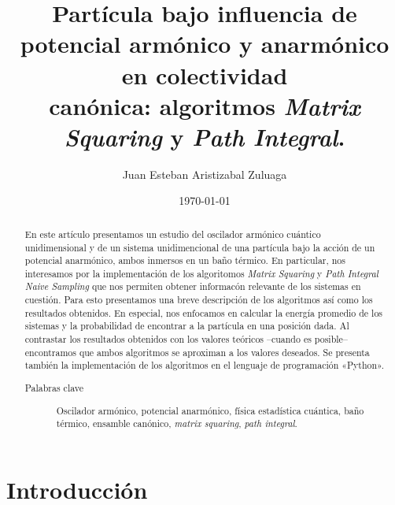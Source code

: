 \documentclass[%
 reprint,
 amsmath,amssymb,
 aps,
 pra,
]{revtex4-2}
\begin{document}

\title{Partícula bajo influencia de potencial armónico y anarmónico en colectividad\texorpdfstring{\\}{ }canónica: algoritmos \textit{Matrix Squaring} y \textit{Path Integral}.}%

\author{Juan Esteban Aristizabal Zuluaga}

\date{\today}%

\begin{abstract}
En este artículo presentamos un estudio del oscilador armónico cuántico unidimensional y de un sistema unidimencional de una partícula bajo la acción de un potencial anarmónico, ambos inmersos en un baño térmico. En particular, nos interesamos por la implementación de los algoritomos \textit{Matrix Squaring} y \textit{Path Integral Naive Sampling} que nos permiten obtener informacón relevante de los sistemas en cuestión. Para esto presentamos una breve descripción de los algoritmos así como los resultados obtenidos. En especial, nos enfocamos en calcular la energía promedio de los sistemas y la probabilidad de encontrar a la partícula en una posición dada. Al contrastar los resultados obtenidos con los valores teóricos –cuando es posible– encontramos que ambos algoritmos se aproximan a los valores deseados. Se presenta también la implementación de los algoritmos en el lenguaje de programación «Python». 
\begin{description}
\item[Palabras clave] 	Oscilador armónico, potencial anarmónico, física estadística cuántica, baño\\
térmico, ensamble canónico, \textit{matrix squaring}, \textit{path integral}.
\end{description}
\end{abstract}

\maketitle


\section{\label{sec:Intro}Introducción}
\end{document}
